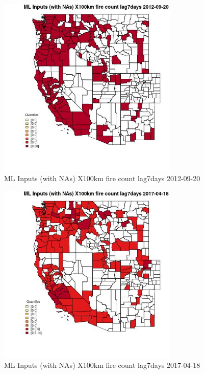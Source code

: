 \begin{figure} 
\centering  
\includegraphics[width=0.77\textwidth]{Code_Outputs/Report_ML_input_PM25_Step4_part_e_de_duplicated_aves_compiled_2019-05-14wNAs_CountyX100km_fire_count_lag7daysMean2012-09-20_2012-09-20.jpg} 
\caption{\label{fig:Report_ML_input_PM25_Step4_part_e_de_duplicated_aves_compiled_2019-05-14wNAsCountyX100km_fire_count_lag7daysMean2012-09-20_2012-09-20}ML Inputs (with NAs) X100km fire count lag7days 2012-09-20} 
\end{figure} 
 

\begin{figure} 
\centering  
\includegraphics[width=0.77\textwidth]{Code_Outputs/Report_ML_input_PM25_Step4_part_e_de_duplicated_aves_compiled_2019-05-14wNAs_CountyX100km_fire_count_lag7daysMean2017-04-18_2017-04-18.jpg} 
\caption{\label{fig:Report_ML_input_PM25_Step4_part_e_de_duplicated_aves_compiled_2019-05-14wNAsCountyX100km_fire_count_lag7daysMean2017-04-18_2017-04-18}ML Inputs (with NAs) X100km fire count lag7days 2017-04-18} 
\end{figure} 
 

